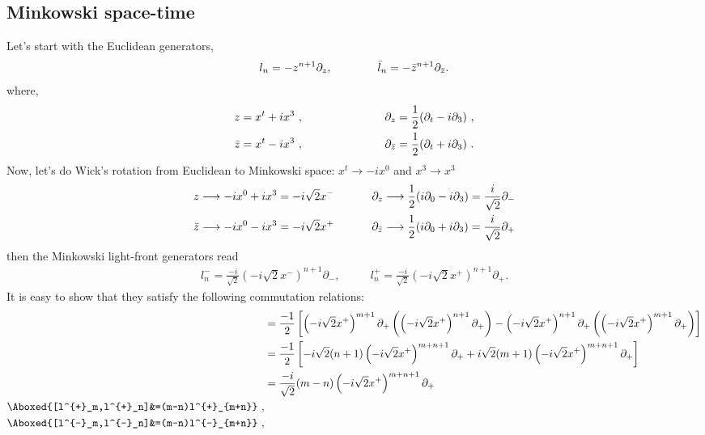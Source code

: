 \documentclass[]{article}
\numberwithin{equation}{section}
\begin{document}
{{\subsection{Minkowski space-time}
Let's start with the Euclidean generators,
\begin{align}
    l_n=-z^{n+1}\partial_{z},~~~~~~~~~~~~\Bar{l}_n=-\Bar{z}^{n+1}\partial_{\Bar{z}}.
\end{align}
where,
\begin{align}
    z=x^t+ix^3~,~~~~~~~~~~~&~~~~~~~~~~~\partial_z=\frac{1}{2}(\partial_t-i\partial_3)~,\\
    \Bar{z}=x^t-ix^3~,~~~~~~~~~~~&~~~~~~~~~~~\partial_{\Bar{z}}=\frac{1}{2}(\partial_t+i\partial_3)~.
\end{align}
Now, let's do Wick's rotation from Euclidean to Minkowski space: $x^t\longrightarrow -ix^{0}$ and $x^3\longrightarrow x^{3}$ 
\begin{align}
    z&\longrightarrow -ix^{0}+ix^3=-i\sqrt{2}x^{-}~~~~~~~~~~\partial_z\longrightarrow\frac{1}{2}(i\partial_0-i\partial_3)=\frac{i}{\sqrt{2}}\partial_{-}\\
    \Bar{z}&\longrightarrow -ix^{0}-ix^3=-i\sqrt{2}x^{+}~~~~~~~~~~\partial_{\Bar{z}}\longrightarrow\frac{1}{2}(i\partial_0+i\partial_3)=\frac{i}{\sqrt{2}}\partial_{+}
\end{align}
then the Minkowski light-front generators read
\begin{align}
    l^{-}_n=\frac{-i}{\sqrt{2}}\left(-i\sqrt{2}x^{-}\right)^{n+1}\partial_{-},~~~~~~~~~~~~l^{+}_n=\frac{-i}{\sqrt{2}}\left(-i\sqrt{2}x^{+}\right)^{n+1}\partial_{+}.
\end{align}
It is easy to show that they satisfy the following commutation relations:
\begin{align}
    [l^{+}_m,l^{+}_n]&=\frac{-1}{2}\left[\left(-i\sqrt{2}x^{+}\right)^{m+1}\partial_{+}\left(\left(-i\sqrt{2}x^{+}\right)^{n+1}\partial_{+}\right)-\left(-i\sqrt{2}x^{+}\right)^{n+1}\partial_{+}\left(\left(-i\sqrt{2}x^{+}\right)^{m+1}\partial_{+}\right)\right]\nonumber\\
    &=\frac{-1}{2}\left[-i\sqrt{2}(n+1)\left(-i\sqrt{2}x^{+}\right)^{m+n+1}\partial_{+}+i\sqrt{2}(m+1)\left(-i\sqrt{2}x^{+}\right)^{m+n+1}\partial_{+}\right]\nonumber\\
    &=\frac{-i}{\sqrt{2}}(m-n)\left(-i\sqrt{2}x^{+}\right)^{m+n+1}\partial_{+}\nonumber\\
    \Aboxed{[l^{+}_m,l^{+}_n]&=(m-n)l^{+}_{m+n}}~,\\
    \Aboxed{[l^{-}_m,l^{-}_n]&=(m-n)l^{-}_{m+n}}~,\\

\end{align}}}
\end{document}
